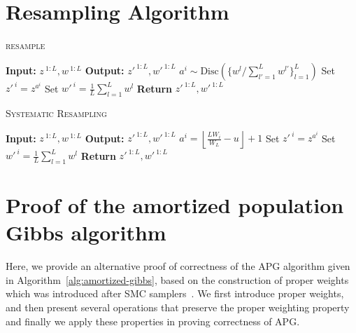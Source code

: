 \documentclass{article}
\theoremstyle{definition}
\begin{document}
\section{Resampling Algorithm}
\label{appendix:resample-algo}
\begin{algorithm}[!t]
  \caption{\textsc{resample}}
  \label{alg:resample}
\begin{algorithmic}[1]
\small
  \State \textbf{Input:} $z^{\:1:L}, w^{\:1:L}$
  \State \textbf{Output:} $z'^{\:1:L}, w'^{\:1:L}$
    \State $a^i \sim \mathrm{Disc}(\{w^l / \sum_{l' = 1}^L w^{l'}\}_{l=1}^L)$ 
    \State Set $ z'^{\:i} = z^{a^i}$
    \State Set $ w'^{\:i} = \frac{1}{L} \sum_{l = 1}^L w^l$
    \EndFor
  \State \textbf{Return} $z'^{\:1:L}, w'^{\:1:L}$
\end{algorithmic}
\end{algorithm}

\begin{algorithm}[!t]
  \caption{\textsc{Systematic Resampling}}
  \label{alg:resampling_sys}
\begin{algorithmic}[1]
\small
    \State \textbf{Input:} $z^{\:1:L}, w^{\:1:L}$
    \State \textbf{Output:} $z'^{\:1:L}, w'^{\:1:L}$
    \State{$u \sim \mathcal{U}[0,1)$}
        \State $a^i = \left\lfloor \frac{LW_i}{W_L} - u \right\rfloor + 1$  
        \State Set $ z'^{\:i} = z^{a^i}$
        \State Set $ w'^{\:i} = \frac{1}{L} \sum_{l = 1}^L w^l$ 
    \EndFor
    \State \textbf{Return} $z'^{\:1:L}, w'^{\:1:L}$
\end{algorithmic}
\end{algorithm}

\section{Proof of the amortized population Gibbs algorithm}
\label{appendix:proof-algo}

Here, we provide an alternative proof of correctness of the APG algorithm given in Algorithm~\ref{alg:amortized-gibbs}, based on the construction of proper weights~\cite{naesseth2015nested} which was introduced after SMC samplers~\cite{delmoral2006sequential}.
We first introduce proper weights, and then present several operations that preserve the proper weighting property and finally we apply these properties in proving correctness of APG.
\end{document}
